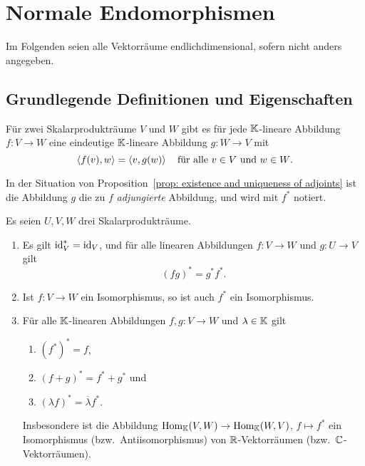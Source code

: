\section{Normale Endomorphismen}


Im Folgenden seien alle Vektorräume endlichdimensional, sofern nicht anders angegeben.










\subsection{Grundlegende Definitionen und Eigenschaften}


\begin{proposition}\label{prop: existence and uniqueness of adjoints}
  Für zwei Skalarprodukträume $V$ und $W$ gibt es für jede $\mathbb{K}$-lineare Abbildung $f \colon V \to W$ eine eindeutige $\mathbb{K}$-lineare Abbildung $g \colon W \to V$ mit
  \[
    \left\langle f(v), w \right\rangle = \left\langle v, g(w) \right\rangle
    \quad
    \text{für alle $v \in V$ und $w \in W$}.
  \]
\end{proposition}


\begin{definition}
  In der Situation von Proposition~\ref{prop: existence and uniqueness of adjoints} ist die Abbildung $g$ die zu $f$ \emph{adjungierte} Abbildung, und wird mit $f^*$ notiert.
\end{definition}


\begin{proposition}
  Es seien $U, V, W$ drei Skalarprodukträume.
  \begin{enumerate}[leftmargin=*, label=\roman*)]
    \item
      Es gilt $\operatorname{id}_V^* = \operatorname{id}_V$, und für alle linearen Abbildungen $f \colon V \to W$ und $g \colon U \to V$ gilt
      \[
        (f g)^* = g^* f^*.
      \]
    \item
      Ist $f \colon V \to W$ ein Isomorphismus, so ist auch $f^*$ ein Isomorphismus.
    \item
      Für alle $\mathbb{K}$-linearen Abbildungen $f, g \colon V \to W$ und $\lambda \in \mathbb{K}$ gilt
      \begin{enumerate}[leftmargin=*, label=\alph*)]
        \item
          $(f^*)^* = f$,
        \item
          $(f + g)^* = f^* + g^*$ und
        \item
          $(\lambda f)^* = \overline{\lambda} f^*$.
      \end{enumerate}
      Insbesondere ist die Abbildung $\operatorname{Hom}_{\mathbb{K}}(V,W) \to \operatorname{Hom}_{\mathbb{K}}(W,V)$, $f \mapsto f^*$ ein Isomorphismus (bzw.\ Antiisomorphismus) von $\mathbb{R}$-Vektorräumen (bzw.\ $\mathbb{C}$-Vektorräumen).
  \end{enumerate}
\end{proposition}


